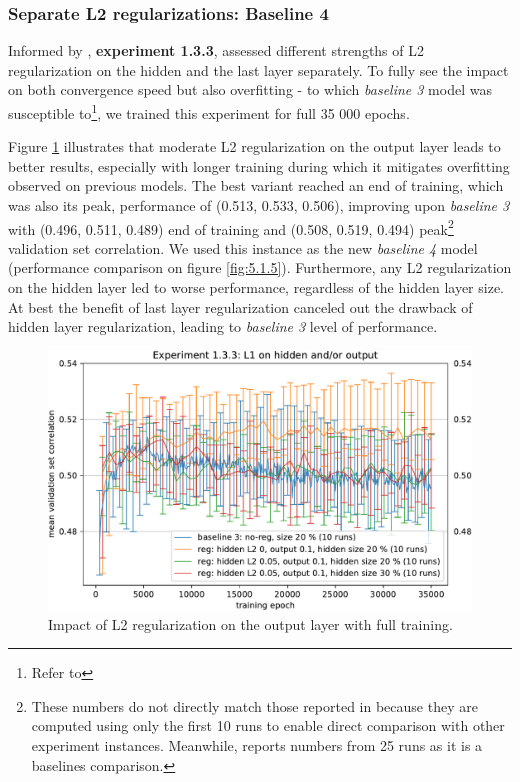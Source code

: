 \subsubsection{Separate L2 regularizations: Baseline 4}\label{ex:1.3.3}

Informed by , \textbf{experiment 1.3.3}, assessed different strengths of L2 regularization on the hidden and the last layer separately. To fully see the impact on both convergence speed but also overfitting - to which \textit{baseline 3} model was susceptible to\footnote{Refer to }, we trained this experiment for full 35 000 epochs.

Figure \ref{fig:5.1.3.3} illustrates that moderate L2 regularization on the output layer leads to better results, especially with longer training during which it mitigates overfitting observed on previous models. The best variant reached an end of training, which was also its peak, performance of (0.513, 0.533, 0.506), improving upon \textit{baseline 3} with (0.496, 0.511, 0.489) end of training and (0.508, 0.519, 0.494) peak\footnote{These numbers do not directly match those reported in  because they are computed using only the first 10 runs to enable direct comparison with other experiment instances. Meanwhile,  reports numbers from 25 runs as it is a baselines comparison.} validation set correlation. We used this instance as the new \textit{baseline 4} model (performance comparison on figure \ref{fig:5.1.5}). Furthermore, any L2 regularization on the hidden layer led to worse performance, regardless of the hidden layer size. At best the benefit of last layer regularization canceled out the drawback of hidden layer regularization, leading to \textit{baseline 3} level of performance.

\begin{figure}[H]
    \centering
    \includegraphics[width=1\textwidth]{../figures/05_1_3_3}
    \caption[Experiment 1.3.3]{Impact of L2 regularization on the output layer with full training.}
    \label{fig:5.1.3.3}
\end{figure}


